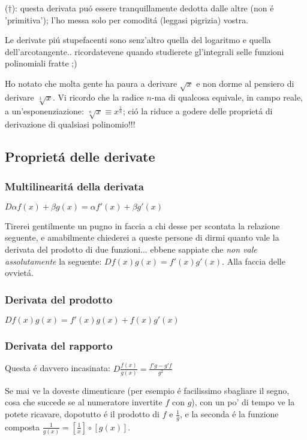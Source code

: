 {\small ($\dagger$): questa derivata pu\'o essere tranquillamente dedotta dalle altre (non \'e 'primitiva'); l'ho messa solo per comodit\'a (leggasi pigrizia) vostra.}

Le derivate pi\'u stupefacenti sono senz'altro quella del logaritmo e quella dell'arcotangente..
ricordatevene quando studierete gl'integrali selle funzioni polinomiali fratte ;)

Ho notato che molta gente ha paura a derivare $\sqrt{x}$ e non dorme al pensiero di derivare $\sqrt[3]{x}$.
Vi ricordo che la radice $n$-ma di qualcosa equivale, in campo reale, a un'esponenziazione: $\sqrt[n]{x} \equiv x^{\frac{1}{n}}$;
ci\'o la riduce a godere delle propriet\'a di derivazione di qualsiasi polinomio!!!


\subsection{Propriet\'a delle derivate}

\subsubsection{Multilinearit\'a della derivata}

$D \alpha f(x)+\beta g(x) = \alpha f'(x) + \beta g'(x)$

Tirerei gentilmente un pugno in faccia a chi desse per scontata la relazione seguente, e amabilmente chiederei
a queste persone di dirmi quanto vale la derivata del prodotto di due funzioni... ebbene sappiate che
{\em non vale assolutamente} la seguente: $D f(x)g(x) = f'(x)g'(x)$. Alla faccia delle ovviet\'a.
\subsubsection{Derivata del prodotto}

$D  f(x)g(x) = f'(x)g(x) + f(x) g'(x)$

\subsubsection{Derivata del rapporto}

Questa \'e davvero incasinata:
$D  \frac{f(x)}{g(x)} = \frac{f'g-g'f}{g^2}$

Se mai ve la doveste dimenticare (per esempio \'e facilissimo sbagliare il segno, cosa che succede se al numeratore invertite $f$ con $g$), con un po' di tempo ve la potete ricavare, dopotutto \'e il prodotto di $f$ e $\frac{1}{g}$, e la seconda \'e la funzione composta $\frac{1}{g(x)}=[\frac{1}{x}]\circ[g(x)]$. 


